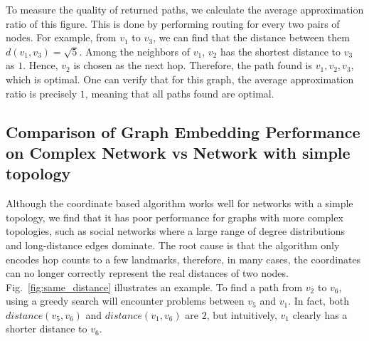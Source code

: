 To measure the quality of returned paths, we calculate the average approximation ratio of this figure. This is done by performing routing for every two pairs of nodes. For example, from $v_1$ to $v_3$, we can find that the distance between them $d(v_1,v_3) = \sqrt{5}$. Among the neighbors of $v_1$, $v_2$ has the shortest distance to $v_3$ as $1$. Hence, $v_2$ is chosen as the next hop. Therefore, the path found is $v_1,v_2,v_3$, which is optimal. One can verify that for this graph, the average approximation ratio is precisely $1$, meaning that all paths found are optimal.

\subsection{Comparison of Graph Embedding Performance on Complex Network vs Network with simple topology}



Although the coordinate based algorithm works well for networks with a simple topology, we find that it has poor performance for graphs with more complex topologies, such as social networks where a large range of degree distributions and long-distance edges dominate. The root cause is that the algorithm only encodes hop counts to a few landmarks, therefore, in many cases, the coordinates can no longer correctly represent the real distances of two nodes. Fig.~\ref{fig:same_distance} illustrates an example. To find a path from $v_2$ to $v_6$, using a greedy search will encounter problems between $v_5$ and $v_1$. In fact, both $distance(v_5,v_6)$ and $distance(v_1,v_6)$ are $2$, but intuitively, $v_1$ clearly has a shorter distance to $v_6$.

